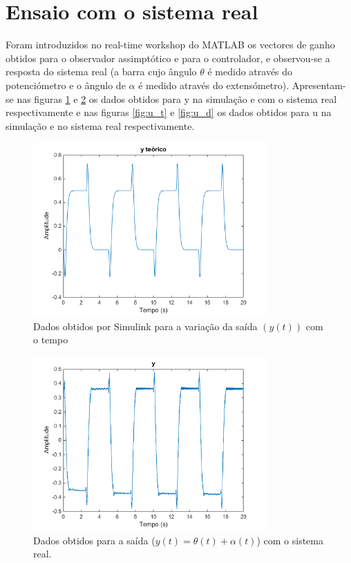 \documentclass[%
  reprint,
  nofootinbib,
  amsmath,amssymb,
  aps,
  10pt,
  a4paper
]{revtex4-1}
\begin{document}
\section{Ensaio com o sistema real}
Foram introduzidos no real-time workshop do MATLAB os vectores de ganho obtidos para o observador assimptótico e para o controlador, e observou-se a resposta do sistema real (a barra cujo ângulo $\theta$ é medido através do potenciómetro e o ângulo de $\alpha$ é medido através do extensómetro). Apresentam-se nas figuras \ref{fig:y_t} e \ref{fig:y_d} os dados obtidos para y na simulação e com o sistema real respectivamente e nas figuras \ref{fig:u_t} e \ref{fig:u_d} os dados obtidos para u na simulação e no sistema real respectivamente.
\begin{figure}
\includegraphics[width=3.5in]{../img/y.png}
\caption{Dados obtidos por Simulink para a variação da saída $(y(t))$ com o tempo}
\label{fig:y_t}
\end{figure}
\begin{figure}
\includegraphics[width=3.5in]{../img/y_dados_01.png}
\caption{Dados obtidos para a saída ($y(t)=\theta(t)+\alpha(t)$) com o sistema real.}
\label{fig:y_d}
\end{figure}
\end{document}
